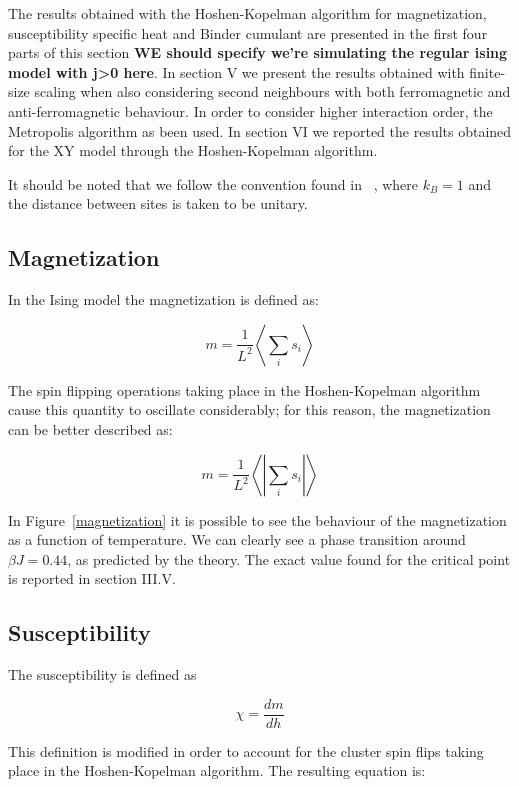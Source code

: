 \documentclass[twoside]{article}
\def\mean#1{\left< #1 \right>}
\begin{document}
\begin{multicols}{2}
The results obtained with the Hoshen-Kopelman algorithm for magnetization, susceptibility specific heat and Binder cumulant are presented in the first four parts of this section \textbf{WE should specify we're simulating the regular ising model with j>0 here}.
In section V we present the results obtained with finite-size scaling when also considering second neighbours with both ferromagnetic and anti-ferromagnetic behaviour. In order to consider higher interaction order, the Metropolis algorithm as been used.
In section VI we reported the results obtained for the XY model through the Hoshen-Kopelman algorithm.

It should be noted that we follow the convention found in ~\cite{thijssen}, where $k_B = 1$ and the distance between sites is taken to be unitary.

\subsection{Magnetization}
In the Ising model the magnetization is defined as:

\begin{equation}
m = \frac{1}{L^2} \mean{\sum_i s_i}
\label{magnetization_conventional}
\end{equation}

The spin flipping operations taking place in the Hoshen-Kopelman algorithm cause this quantity to oscillate considerably; for this reason, the magnetization can be better described as:

\begin{equation}
m = \frac{1}{L^2} \mean{\left|\sum_i s_i\right|}
\end{equation}

In Figure~\ref{magnetization} it is possible to see the behaviour of the magnetization as a function of temperature. We can clearly see a phase transition around $\beta J = 0.44$, as predicted by the theory. The exact value found for the critical point is reported in section III.V.

\subsection{Susceptibility}
The susceptibility is defined as 

\begin{equation}
\chi = \frac{dm}{dh}
\end{equation}

This definition is modified in order to account for the cluster spin flips taking place in the Hoshen-Kopelman algorithm. The resulting equation is:


\end{multicols}
\end{document}
